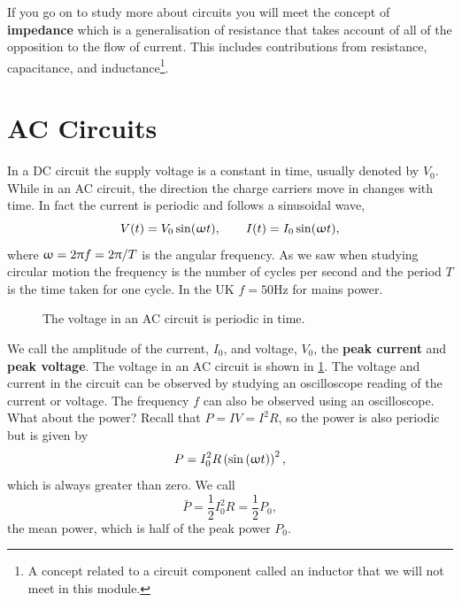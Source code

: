 If you go on to study more about circuits you will meet the concept of \textbf{impedance} which is a generalisation of resistance that takes account of all of the opposition to the flow of current. This includes contributions from resistance, capacitance, and inductance\footnote{A concept related to a circuit component called an inductor that we will not meet in this module.}.

\section{AC Circuits}
In a DC circuit the supply voltage is a constant in time, usually denoted by  $V_{0}$. While in an AC circuit, the direction the charge carriers move in changes with time. In fact the current is periodic and follows a sinusoidal wave, 
\begin{equation*}
V(t)=V_{0}\sin(\upomega t),\qquad I(t)=I_{0}\sin(\upomega t),
\end{equation*}
where $\upomega=2\uppi f=2\uppi/T$ is the angular frequency. As we saw when studying circular motion the frequency is the number of cycles per second and the period $T$ is the time taken for one cycle. In the UK $f=50\text{Hz}$ for mains power.\\

\begin{figure}[ht]
    \centering
    \caption{The voltage in an AC circuit is periodic in time.}
        \label{fig: AC voltage}
\end{figure}

We call the amplitude of the current, $I_{0}$, and voltage, $V_{0}$, the \textbf{peak current} and \textbf{peak voltage}. The voltage in an AC circuit is shown in \cref{fig: AC voltage}. The voltage and current in the circuit can be observed by studying an oscilloscope reading of the current or voltage. The frequency $f$ can also be observed using an oscilloscope. What about the power? Recall that $P=IV=I^{2}R$, so the power is also periodic but is given by
\begin{equation*}
P=I_{0}^{2}R\left(\sin\left(\upomega t\right)\right)^{2},
\end{equation*}
which is always greater than zero. We call 
\begin{equation*}
\bar{P}=\frac{1}{2}I_{0}^{2}R=\frac{1}{2}P_{0},
\end{equation*}
the mean power, which is half of the peak power $P_{0}$.\\

